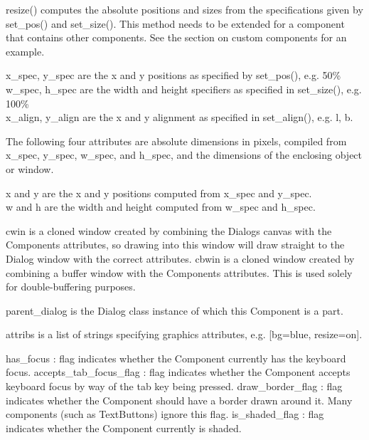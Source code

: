 
resize() computes the absolute positions and sizes from the
specifications given by set\_pos() and set\_size(). This method needs
to be extended for a component that contains other components. See the
section on custom components for an example.

x\_spec, y\_spec are the x and y positions as specified by set\_pos(),
e.g. {\textquotedbl}50\%{\textquotedbl}\\
w\_spec, h\_spec are the width and height specifiers as specified in
set\_size(), e.g. {\textquotedbl}100\%{\textquotedbl}\\
x\_align, y\_align are the x and y alignment as specified in
set\_align(), e.g. {\textquotedbl}l{\textquotedbl},
{\textquotedbl}b{\textquotedbl}.

The following four attributes are absolute dimensions in pixels,
compiled from x\_spec, y\_spec, w\_spec, and h\_spec, and the
dimensions of the enclosing object or window.

x and y are the x and y positions computed from x\_spec and
y\_spec.\\
w and h are the width and height computed from w\_spec and h\_spec.

cwin is a cloned window created by combining the
Dialog{\textquotesingle}s canvas with the Component{\textquotesingle}s
attributes, so drawing into this window will draw straight to the
Dialog window with the correct attributes. cbwin is a cloned window
created by combining a buffer window with the
Component{\textquotesingle}s attributes. This is used solely for
double-buffering purposes.

parent\_dialog is the Dialog class instance of which
this Component is a part.

attribs is a list of strings specifying graphics attributes, e.g.
[{\textquotedbl}bg=blue{\textquotedbl},
{\textquotedbl}resize=on{\textquotedbl}].

has\_focus : flag indicates whether the Component currently has the
keyboard focus. accepts\_tab\_focus\_flag : flag indicates whether the
Component accepts keyboard focus by way of the tab key being pressed.
draw\_border\_flag : flag indicates whether the Component should have a
border drawn around it. Many components (such as TextButtons) ignore
this flag. is\_shaded\_flag : flag indicates whether the Component
currently is shaded.

